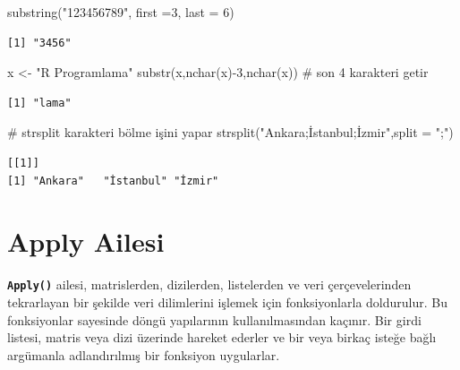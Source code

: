 \documentclass[
  letterpaper,
  DIV=11,
  numbers=noendperiod]{scrreprt}
\newenvironment{Shaded}{\begin{snugshade}}{\end{snugshade}}
\newcommand{\AttributeTok}[1]{\textcolor[rgb]{0.40,0.45,0.13}{#1}}
\newcommand{\CommentTok}[1]{\textcolor[rgb]{0.37,0.37,0.37}{#1}}
\newcommand{\DecValTok}[1]{\textcolor[rgb]{0.68,0.00,0.00}{#1}}
\newcommand{\FunctionTok}[1]{\textcolor[rgb]{0.28,0.35,0.67}{#1}}
\newcommand{\NormalTok}[1]{\textcolor[rgb]{0.00,0.23,0.31}{#1}}
\newcommand{\OtherTok}[1]{\textcolor[rgb]{0.00,0.23,0.31}{#1}}
\newcommand{\SpecialCharTok}[1]{\textcolor[rgb]{0.37,0.37,0.37}{#1}}
\newcommand{\StringTok}[1]{\textcolor[rgb]{0.13,0.47,0.30}{#1}}
\begin{document}
\begin{Shaded}
\begin{Highlighting}[]
\FunctionTok{substring}\NormalTok{(}\StringTok{"123456789"}\NormalTok{, }\AttributeTok{first =}\DecValTok{3}\NormalTok{, }\AttributeTok{last =} \DecValTok{6}\NormalTok{)}
\end{Highlighting}
\end{Shaded}

\begin{verbatim}
[1] "3456"
\end{verbatim}

\begin{Shaded}
\begin{Highlighting}[]
\NormalTok{x }\OtherTok{\textless{}{-}} \StringTok{"R Programlama"}
\FunctionTok{substr}\NormalTok{(x,}\FunctionTok{nchar}\NormalTok{(x)}\SpecialCharTok{{-}}\DecValTok{3}\NormalTok{,}\FunctionTok{nchar}\NormalTok{(x)) }\CommentTok{\# son 4 karakteri getir}
\end{Highlighting}
\end{Shaded}

\begin{verbatim}
[1] "lama"
\end{verbatim}

\begin{Shaded}
\begin{Highlighting}[]
\CommentTok{\# strsplit karakteri bölme işini yapar}
\FunctionTok{strsplit}\NormalTok{(}\StringTok{"Ankara;İstanbul;İzmir"}\NormalTok{,}\AttributeTok{split =} \StringTok{";"}\NormalTok{)}
\end{Highlighting}
\end{Shaded}

\begin{verbatim}
[[1]]
[1] "Ankara"   "İstanbul" "İzmir"   
\end{verbatim}

\chapter{Apply Ailesi}\label{apply-ailesi}

\textbf{\texttt{Apply()}} ailesi, matrislerden, dizilerden, listelerden
ve veri çerçevelerinden tekrarlayan bir şekilde veri dilimlerini işlemek
için fonksiyonlarla doldurulur. Bu fonksiyonlar sayesinde döngü
yapılarının kullanılmasından kaçınır. Bir girdi listesi, matris veya
dizi üzerinde hareket ederler ve bir veya birkaç isteğe bağlı argümanla
adlandırılmış bir fonksiyon uygularlar.
\end{document}
